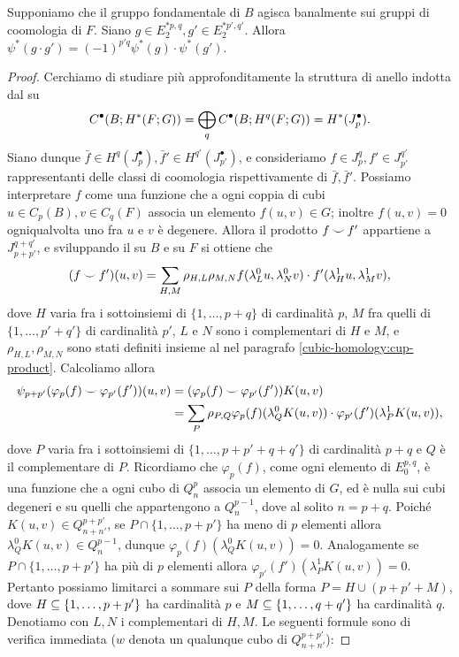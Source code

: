\begin{proposition}
Supponiamo che il gruppo fondamentale di $B$ agisca banalmente sui gruppi di coomologia di $F$. Siano $g\in E^{\ast p,q}_2,g'\in E^{\ast p',q'}_2$. Allora $\psi^*(g\cdot g')=(-1)^{p'q}\psi^*(g)\cdot\psi^*(g')$.
\end{proposition}
\begin{proof}
Cerchiamo di studiare più approfonditamente la struttura di anello indotta dal \cupproduct{} su 
$$
C^\bullet(B;H^*(F;G))=\bigoplus_qC^\bullet(B;H^q(F;G))=H^*(J^\bullet_p).
$$
Siano dunque $\bar{f}\in H^q(J^\bullet_p),\bar{f}'\in H^{q'}(J^\bullet_{p'})$, e consideriamo $f\in J^q_p,f'\in J^{q'}_{p'}$ rappresentanti delle classi di coomologia rispettivamente di $\bar{f},\bar{f}'$. Possiamo interpretare $f$ come una funzione che a ogni coppia di cubi $u\in C_p(B),v\in C_q(F)$ associa un elemento $f(u,v)\in G$; inoltre $f(u,v)=0$ ogniqualvolta uno fra $u$ e $v$ è degenere. Allora il prodotto $f\mathbin{\smile} f'$ appartiene a $J^{q+q'}_{p+p'}$, e sviluppando il \cupproduct{} su $B$ e su $F$ si ottiene che
$$
(f\mathbin{\smile} f')(u,v)=\sum_{H,M}\rho_{H,L}\rho_{M,N}f(\lambda^0_Lu,\lambda^0_Nv)\cdot f'(\lambda^1_Hu,\lambda^1_Mv),
$$
dove $H$ varia fra i sottoinsiemi di $\{1,\ldots,p+q\}$ di cardinalità $p$, $M$ fra quelli di $\{1,\ldots,p'+q'\}$ di cardinalità $p'$, $L$ e $N$ sono i complementari di $H$ e $M$, e $\rho_{H,L},\rho_{M,N}$ sono stati definiti insieme al \cupproduct{} nel paragrafo \ref{cubic-homology:cup-product}. Calcoliamo allora
\begin{align*}
\psi_{p+p'}(\varphi_p(f)\mathbin{\smile}\varphi_{p'}(f'))(u,v)&=(\varphi_p(f)\mathbin{\smile}\varphi_{p'}(f'))K(u,v)\\
&=\sum_P\rho_{P,Q}\varphi_p(f)(\lambda^0_QK(u,v))\cdot\varphi_{p'}(f')(\lambda^1_PK(u,v)),
\end{align*}
dove $P$ varia fra i sottoinsiemi di $\{1,\ldots,p+p'+q+q'\}$ di cardinalità $p+q$ e $Q$ è il complementare di $P$. Ricordiamo che $\varphi_p(f)$, come ogni elemento di $E^{p,q}_0$, è una funzione che a ogni cubo di $Q^p_n$ associa un elemento di $G$, ed è nulla sui cubi degeneri e su quelli che appartengono a $Q^{p-1}_n$, dove al solito $n=p+q$. Poiché $K(u,v)\in Q^{p+p'}_{n+n'}$, se $P\cap\{1,\ldots,p+p'\}$ ha meno di $p$ elementi allora $\lambda^0_QK(u,v)\in Q^{p-1}_{n}$, dunque $\varphi_{p}(f)(\lambda^0_QK(u,v))=0$. Analogamente se $P\cap\{1,\ldots,p+p'\}$ ha più di $p$ elementi allora $\varphi_{p'}(f')(\lambda^1_PK(u,v))=0$. Pertanto possiamo limitarci a sommare sui $P$ della forma $P=H\cup(p+p'+M)$, dove $H\subseteq\{1,\ldots,p+p'\}$ ha cardinalità $p$ e $M\subseteq\{1,\ldots,q+q'\}$ ha cardinalità $q$. Denotiamo con $L,N$ i complementari di $H,M$. Le seguenti formule sono di verifica immediata ($w$ denota un qualunque cubo di $Q^{p+p'}_{n+n'}$):

\end{proof}
